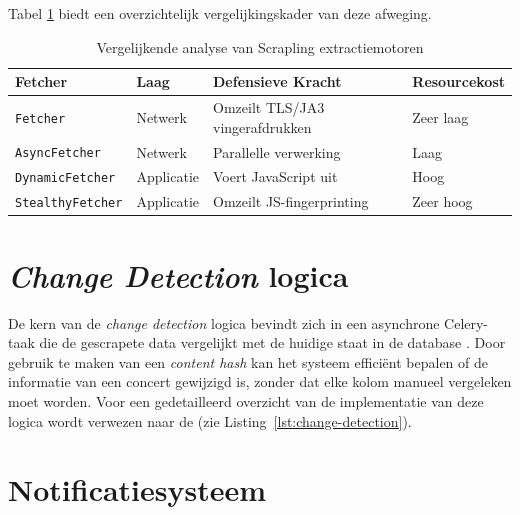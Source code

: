 Tabel \ref{tab:fetcher-vergelijking} biedt een overzichtelijk 
vergelijkingskader van deze afweging.

\begin{table}[h]
\centering
\caption{Vergelijkende analyse van Scrapling extractiemotoren}
\label{tab:fetcher-vergelijking}
\begin{tabular}{p{3cm} p{2.5cm} p{4cm} p{2.5cm}}
\hline
\textbf{Fetcher} & \textbf{Laag} & \textbf{Defensieve Kracht} & \textbf{Resourcekost} \\
\hline
\texttt{Fetcher} & Netwerk & Omzeilt TLS/JA3 vingerafdrukken & Zeer laag \\
\texttt{AsyncFetcher} & Netwerk & Parallelle verwerking & Laag \\
\texttt{DynamicFetcher} & Applicatie & Voert JavaScript uit & Hoog \\
\texttt{StealthyFetcher} & Applicatie & Omzeilt JS-fingerprinting & Zeer hoog \\
\hline
\end{tabular}
\end{table}

\section{\textit{Change Detection} logica}

De kern van de \textit{change detection} logica bevindt zich in een asynchrone Celery-taak die de gescrapete data vergelijkt met de huidige staat in de database . 
Door gebruik te maken van een \textit{content hash} kan het systeem efficiënt bepalen of de informatie van een concert gewijzigd is, zonder dat elke kolom manueel vergeleken moet worden. 
Voor een gedetailleerd overzicht van de implementatie van deze logica wordt verwezen naar de  (zie Listing~\ref{lst:change-detection}).

\section{Notificatiesysteem}

